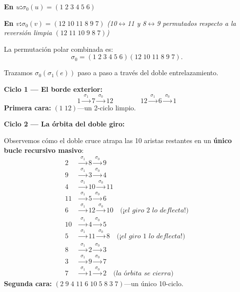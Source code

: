 \documentclass[11pt, a4paper, openany]{book}
\begin{document}
\medskip
\noindent
\textbf{En $u$:}\quad $\sigma_0(u) = (1\;2\;3\;4\;5\;6)$

\noindent
\textbf{En $v$:}\quad $\sigma_0(v) = (12\;10\;11\;8\;9\;7)$
\quad\textit{(10$\leftrightarrow$11 y 8$\leftrightarrow$9 permutados
respecto a la reversión limpia $(12\;11\;10\;9\;8\;7)$)}

\medskip
\noindent
La permutación polar combinada es:
\[
  \sigma_0 = (1\;2\;3\;4\;5\;6)(12\;10\;11\;8\;9\;7).
\]

\medskip
\noindent
Trazamos $\sigma_0(\sigma_1(e))$ paso a paso a través del doble
entrelazamiento.

\medskip
\noindent
\textbf{Ciclo 1 --- El borde exterior:}
\[
  1 \xrightarrow{\;\sigma_1\;} 7 \xrightarrow{\;\sigma_0\;} 12
  \qquad\qquad
  12 \xrightarrow{\;\sigma_1\;} 6 \xrightarrow{\;\sigma_0\;} 1
\]
\textbf{Primera cara:} $(1\;12)$---un 2-ciclo limpio.

\medskip
\noindent
\textbf{Ciclo 2 --- La órbita del doble giro:}

Observemos cómo el doble cruce atrapa las 10 aristas restantes en un
\textbf{único bucle recursivo masivo}:
\begin{align*}
  2 &\xrightarrow{\;\sigma_1\;} 8  \xrightarrow{\;\sigma_0\;} 9 \\
  9 &\xrightarrow{\;\sigma_1\;} 3  \xrightarrow{\;\sigma_0\;} 4 \\
  4 &\xrightarrow{\;\sigma_1\;} 10 \xrightarrow{\;\sigma_0\;} 11 \\
  11 &\xrightarrow{\;\sigma_1\;} 5  \xrightarrow{\;\sigma_0\;} 6 \\
  6 &\xrightarrow{\;\sigma_1\;} 12 \xrightarrow{\;\sigma_0\;} 10
    \quad\textit{(¡el giro~2 lo deflecta!)} \\
  10 &\xrightarrow{\;\sigma_1\;} 4  \xrightarrow{\;\sigma_0\;} 5 \\
  5 &\xrightarrow{\;\sigma_1\;} 11 \xrightarrow{\;\sigma_0\;} 8
    \quad\textit{(¡el giro~1 lo deflecta!)} \\
  8 &\xrightarrow{\;\sigma_1\;} 2  \xrightarrow{\;\sigma_0\;} 3 \\
  3 &\xrightarrow{\;\sigma_1\;} 9  \xrightarrow{\;\sigma_0\;} 7 \\
  7 &\xrightarrow{\;\sigma_1\;} 1  \xrightarrow{\;\sigma_0\;} 2
    \quad\textit{(la órbita se cierra)}
\end{align*}
\textbf{Segunda cara:}
$(2\;9\;4\;11\;6\;10\;5\;8\;3\;7)$---un único 10-ciclo.
\end{document}

